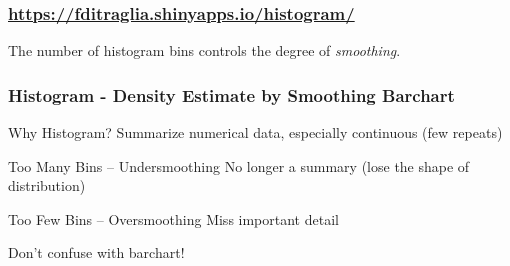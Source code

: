 \begin{frame}
	\frametitle{\href{https://fditraglia.shinyapps.io/histogram/}{https://fditraglia.shinyapps.io/histogram/}}

\begin{figure}
\end{figure}

\alert{The number of histogram bins controls the degree of \emph{smoothing}.}

\end{frame}

\begin{frame}
  \frametitle{Histogram - Density Estimate by Smoothing Barchart} 

\begin{block}{Why Histogram?}
Summarize numerical data, especially continuous (few repeats)
\end{block}

\begin{block}{Too Many Bins -- Undersmoothing}
No longer a summary (lose the shape of distribution)
\end{block}

\begin{block}{Too Few Bins -- Oversmoothing}
Miss important detail
\end{block}

\begin{alertblock}{Don't confuse with barchart!}
\end{alertblock}
\end{frame}

